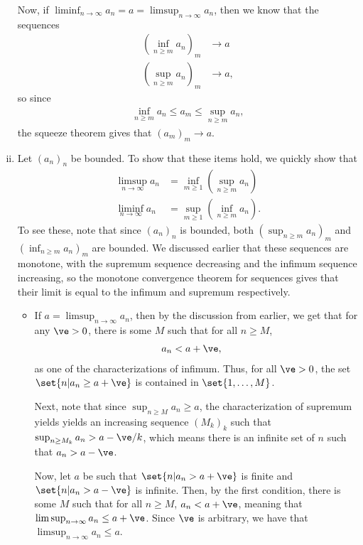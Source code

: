 \documentclass[10pt]{mypackage}
\begin{document}
\begin{enumerate}[(i)]
    Now, if $\liminf_{n\rightarrow\infty} a_n = a = \limsup_{n\rightarrow\infty} a_n$, then we know that the sequences
    \begin{align*}
      \left( \inf_{n\geq m}a_n \right)_{m} &\rightarrow a\\
      \left( \sup_{n\geq m}a_n \right)_{m} &\rightarrow a,
    \end{align*}
    so since
    \begin{align*}
      \inf_{n\geq m}a_n \leq a_m \leq \sup_{n\geq m}a_n,
    \end{align*}
    the squeeze theorem gives that $\left( a_m \right)_m\rightarrow a$.
  \item Let $\left( a_n \right)_n$ be bounded. To show that these items hold, we quickly show that
    \begin{align*}
      \limsup_{n\rightarrow\infty} a_n &= \inf_{m\geq 1}\left( \sup_{n\geq m}a_n \right)\\
      \liminf_{n\rightarrow\infty} a_n &= \sup_{m\geq 1}\left( \inf_{n\geq m} a_n \right).
    \end{align*}
    To see these, note that since $\left( a_n \right)_n$ is bounded, both $\left( \sup_{n\geq m}a_n \right)_{m}$ and $\left( \inf_{n\geq m}a_n \right)_{m}$ are bounded. We discussed earlier that these sequences are monotone, with the supremum sequence decreasing and the infimum sequence increasing, so the monotone convergence theorem for sequences gives that their limit is equal to the infimum and supremum respectively.
    \begin{itemize}
      \item If $a = \limsup_{n\rightarrow\infty}a_n$, then by the discussion from earlier, we get that for any $\ve > 0$, there is some $M$ such that for all $n\geq M$,
        \begin{align*}
          a_n &< a + \ve,
        \end{align*}
        as one of the characterizations of infimum. Thus, for all $\ve > 0$, the set $\set{n | a_n \geq a + \ve}$ is contained in $\set{1,\dots,M}$.\newline

        Next, note that since $\sup_{n\geq M}a_n \geq a$, the characterization of supremum yields yields an increasing sequence $\left( M_k \right)_k$ such that $\sup_{n\geq M_k}a_n > a-\ve/k$, which means there is an infinite set of $n$ such that $a_n > a-\ve$.\newline

        Now, let $a$ be such that $\set{n | a_n > a + \ve}$ is finite and $\set{n | a_n > a-\ve}$ is infinite. Then, by the first condition, there is some $M$ such that for all $n\geq M$, $a_n < a + \ve$, meaning that $\limsup_{n\rightarrow\infty} a_n \leq a + \ve$. Since $\ve$ is arbitrary, we have that $\limsup_{n\rightarrow\infty} a_n \leq a$.\newline


\end{itemize}
\end{enumerate}
\end{document}
